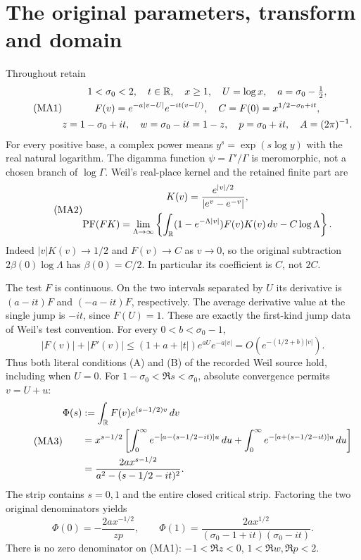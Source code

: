 \section{The original parameters, transform and domain}
Throughout retain
\begin{equation}\tag{MA1}\begin{gathered}
 1<\sigma_0<2,\quad t\in\mathbb R,\quad x\ge1,\quad U=\log x,\quad
 a=\sigma_0-\tfrac12,\\
 F(v)=e^{-a|v-U|}e^{-it(v-U)},\quad
 C=F(0)=x^{1/2-\sigma_0+it},\\
 z=1-\sigma_0+it,\quad w=\sigma_0-it=1-z,\quad
 p=\sigma_0+it,\quad A=(2\pi)^{-1}.
\end{gathered}\end{equation}
For every positive base, a complex power means $y^s=\exp(s\log y)$ with
the real natural logarithm. The digamma function $\psi=\Gamma'/\Gamma$
is meromorphic, not a chosen branch of $\log\Gamma$.
Weil's real-place kernel and the retained finite part \cite{a03ma:Weil} are
\begin{equation}\tag{MA2}\begin{gathered}
 K(v)=\frac{e^{|v|/2}}{|e^v-e^{-v}|},\\
 \operatorname{PF}(FK)=\lim_{\Lambda\to\infty}
 \left\{\int_\mathbb R(1-e^{-\Lambda|v|})F(v)K(v)\,d v-C\log\Lambda\right\}.
\end{gathered}\end{equation}
Indeed $|v|K(v)\to1/2$ and $F(v)\to C$ as $v\to0$, so the original
subtraction $2\beta(0)\log\Lambda$ has $\beta(0)=C/2$. In particular its
coefficient is $C$, not $2C$.

The test $F$ is continuous. On the two intervals separated by $U$ its
derivative is $(a-it)F$ and $(-a-it)F$, respectively. The average derivative
value at the single jump is $-it$, since $F(U)=1$. These are exactly the
first-kind jump data of Weil's test convention. For every
$0<b<\sigma_0-1$,
\[
 |F(v)|+|F'(v)|\le(1+a+|t|)e^{aU}e^{-a|v|}
 =O(e^{-(1/2+b)|v|}).
\]
Thus both literal conditions (A) and (B) of the recorded Weil source hold,
including when $U=0$.
For $1-\sigma_0<\Re s<\sigma_0$, absolute convergence permits $v=U+u$:
\begin{equation}\tag{MA3}\begin{aligned}
 \Phi(s)&:=\int_\mathbb R F(v)e^{(s-1/2)v}\,d v\\
 &=x^{s-1/2}\left[
 \int_0^\infty e^{-[a-(s-1/2-it)]u}\,d u
 +\int_0^\infty e^{-[a+(s-1/2-it)]u}\,d u\right]\\
 &=\frac{2a x^{s-1/2}}{a^2-(s-1/2-it)^2}.
\end{aligned}\end{equation}
The strip contains $s=0,1$ and the entire closed critical strip. Factoring
the two original denominators yields
\begin{equation}\tag{MA4}
 \Phi(0)=-\frac{2a x^{-1/2}}{zp},\qquad
 \Phi(1)=\frac{2a x^{1/2}}{(\sigma_0-1+it)(\sigma_0-it)}.
\end{equation}
There is no zero denominator on (MA1): $-1<\Re z<0$, $1<\Re w,\Re p<2$.

